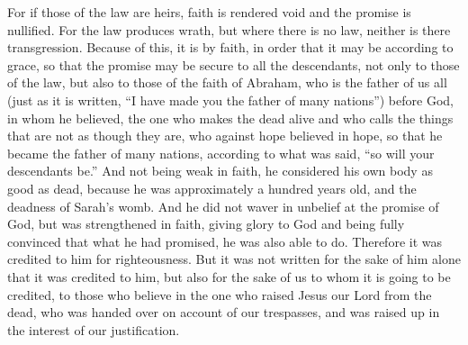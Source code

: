 \begin{biblechapter}
\verse For if those of the law are heirs, faith is rendered void and the promise is nullified.
\verse For the law produces wrath, but where there is no law, neither is there transgression.
\verse Because of this, it is by faith, in order that it may be according to grace, so that the promise may be secure to all the descendants, not only to those of the law, but also to those of the faith of Abraham, who is the father of us all
\verse (just as it is written, “I have made you the father of many nations”) before God, in whom he believed, the one who makes the dead alive and who calls the things that are not as though they are,
\verse who against hope believed in hope, so that he became the father of many nations, according to what was said, “so will your descendants be.”
\verse And not being weak in faith, he considered his own body as good as dead,  because he was approximately a hundred years old, and the deadness of Sarah’s womb.
\verse And he did not waver in unbelief at the promise of God, but was strengthened in faith, giving glory to God
\verse and being fully convinced that what he had promised, he was also able to do.
\verse Therefore it was credited to him for righteousness.
\verse But it was not written for the sake of him alone that it was credited to him,
\verse but also for the sake of us to whom it is going to be credited, to those who believe in the one who raised Jesus our Lord from the dead,
\verse who was handed over on account of our trespasses, and was raised up in the interest of our justification.
\end{biblechapter}

